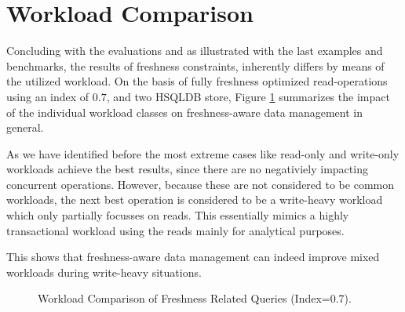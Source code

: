 \section{Workload Comparison}

Concluding with the evaluations and as illustrated with the last examples and benchmarks, the results of freshness constraints, 
inherently differs by means of the utilized workload.
On the basis of fully freshness optimized read-operations using an index of $0.7$, and two HSQLDB store,
Figure \ref{fig:workload_comp} summarizes the impact of the individual workload classes on freshness-aware data management in general. 


As we have identified before the most extreme cases like read-only and write-only workloads achieve the best results,
since there are no negativiely impacting concurrent operations.
However, because these are not considered to be common workloads, the next best operation is considered to be a write-heavy workload 
which only partially focusses on reads.
This essentially mimics a highly transactional workload using the reads mainly for analytical purposes.


This shows that freshness-aware data management can indeed improve mixed workloads during write-heavy situations.

\begin{figure}[t] 
    \centering 
    \caption{Workload Comparison of Freshness Related Queries (Index=0.7).}
    \label{fig:workload_comp}
\end{figure}


